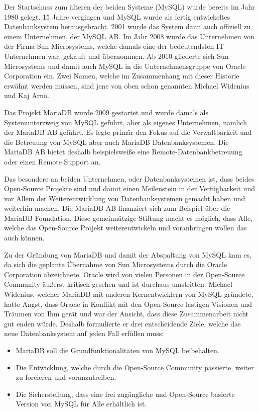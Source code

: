 
Der Startschuss zum älteren der beiden Systeme (MySQL) wurde bereits im Jahr 1980 gelegt. 15 Jahre vergingen und MySQL wurde als fertig entwickeltes Datenbanksystem herausgebracht. 2001 wurde das System dann auch offiziell zu einem Unternehmen, der MySQL AB. Im Jahr 2008 wurde das Unternehmen von der Firma Sun Microsystems, welche damals eine der bedeutendsten IT-Unternehmen war, gekauft und übernommen. Ab 2010 gliederte sich Sun Microsystems und damit auch MySQL in die Unternehmensgruppe von Oracle Corporation ein. Zwei Namen, welche im Zusammenhang mit dieser Historie erwähnt werden müssen, sind jene von oben schon genannten Michael Widenius und Kaj Arnö. \cite{MariaMy}

Das Projekt MariaDB wurde 2009 gestartet und wurde damals als Systemunterzweig von MySQL geführt, aber als eigenes Unternehmen, nämlich der MariaDB AB geführt. Es legte primär den Fokus auf die Verwaltbarkeit und die Betreuung von MySQL aber auch MariaDB Datenbanksystemen. Die MariaDB AB bietet deshalb beispielsweiße eine Remote-Datenbankbetreuung oder einen Remote Support an. \cite{MariaMy}

Das besondere an beiden Unternehmen, oder Datenbanksystemen ist, dass beides Open-Source Projekte sind und damit einen Meilenstein in der Verfügbarkeit und vor Allem der Weiterentwicklung von Datenbanksystemen gemacht haben und weiterhin machen. Die MariaDB AB finanziert sich zum Beispiel über die MariaDB Foundation. Diese gemeinnützige Stiftung macht es möglich, dass Alle, welche das Open-Source Projekt weiterentwickeln und voranbringen wollen das auch können. \cite{MariaMy}

Zu der Gründung von MariaDB und damit der Abspaltung von MySQL kam es, da sich die geplante Übernahme von Sun Microsystems durch die Oracle Corporation abzeichnete. Oracle wird von vielen Personen in der Open-Source Community äußerst kritisch gesehen und ist durchaus umstritten. Michael Widenius, welcher MariaDB mit anderen Kernentwicklern von MySQL gründete, hatte Angst, dass Oracle in Konflikt mit den Open-Source lastigen Visionen und Träumen von Ihm gerät und war der Ansicht, dass diese Zusammenarbeit nicht gut enden würde. Deshalb formulierte er drei entscheidende Ziele, welche das neue Datenbanksystem auf jeden Fall erfüllen muss: \cite{MariaMy}

\begin{itemize}
    \item MariaDB soll die Grundfunktionalitäten von MySQL beibehalten.
    \item Die Entwicklung, welche durch die Open-Source Community passierte, weiter zu forcieren und voranzutreiben.
    \item Die Sicherstellung, dass eine frei zugängliche und Open-Source basierte Version von MySQL für Alle erhältlich ist.
\end{itemize}

\cite{MariaMy}